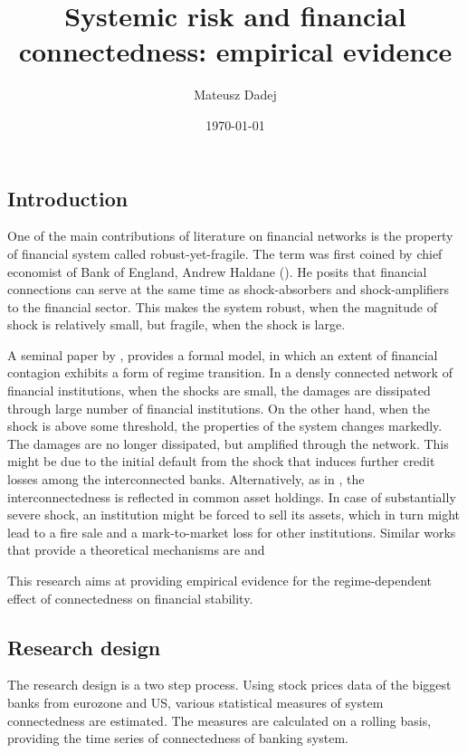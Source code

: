\documentclass{article}
\title{Systemic risk and financial connectedness: empirical evidence}
\author[1]{Mateusz Dadej}
\date{\today}
\begin{document}
\maketitle

\subsection*{Introduction}

One of the main contributions of literature on financial networks is the property of financial system called robust-yet-fragile. The term was first coined by chief economist of Bank of England, Andrew Haldane (\citet{haldane}). He posits that financial connections can serve at the same time as shock-absorbers and shock-amplifiers to the financial sector. This makes the system robust, when the magnitude of shock is relatively small, but fragile, when the shock is large. 

A seminal paper by \citet{acemoglu}, provides a formal model, in which an extent of financial contagion exhibits a form of regime transition. In a densly connected network of financial institutions, when the shocks are small, the damages are dissipated through large number of financial institutions. On the other hand, when the shock is above some threshold, the properties of the system changes markedly. The damages are no longer dissipated, but amplified through the network. This might be due to the initial default from the shock that induces further credit losses among the interconnected banks. Alternatively, as in \citet{golub}, the interconnectedness is reflected in common asset holdings. In case of substantially severe shock, an institution might be forced to sell its assets, which in turn might lead to a fire sale and a mark-to-market loss for other institutions. Similar works that provide a theoretical mechanisms are \citet{callaway} and \citet{gai}

This research aims at providing empirical evidence for the regime-dependent effect of connectedness on financial stability. 

\subsection*{Research design}

The research design is a two step process. Using stock prices data of the biggest banks from eurozone and US, various statistical measures of system connectedness are estimated. The measures are calculated on a rolling basis, providing the time series of connectedness of banking system. 
\end{document}
